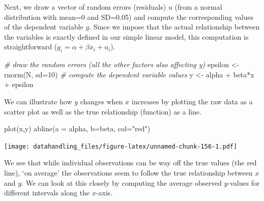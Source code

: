 \documentclass[
  12pt,
]{style/krantz}
\newenvironment{Shaded}{\begin{snugshade}}{\end{snugshade}}
\newcommand{\AttributeTok}[1]{\textcolor[rgb]{0.77,0.63,0.00}{#1}}
\newcommand{\CommentTok}[1]{\textcolor[rgb]{0.56,0.35,0.01}{\textit{#1}}}
\newcommand{\DecValTok}[1]{\textcolor[rgb]{0.00,0.00,0.81}{#1}}
\newcommand{\FunctionTok}[1]{\textcolor[rgb]{0.00,0.00,0.00}{#1}}
\newcommand{\NormalTok}[1]{#1}
\newcommand{\OtherTok}[1]{\textcolor[rgb]{0.56,0.35,0.01}{#1}}
\newcommand{\SpecialCharTok}[1]{\textcolor[rgb]{0.00,0.00,0.00}{#1}}
\newcommand{\StringTok}[1]{\textcolor[rgb]{0.31,0.60,0.02}{#1}}
\begin{document}
Next, we draw a vector of random errors (residuals) \(u\) (from a normal distribution with mean=0 and SD=0.05) and compute the corresponding values of the dependent variable \(y\). Since we impose that the actual relationship between the variables is exactly defined in our simple linear model, this computation is straightforward (\(y_{i}= \alpha + \beta x_{i} + u_{i}\)).

\begin{Shaded}
\begin{Highlighting}[]
\CommentTok{\# draw the random errors (all the other factors also affecting y)}
\NormalTok{epsilon }\OtherTok{\textless{}{-}} \FunctionTok{rnorm}\NormalTok{(N, }\AttributeTok{sd=}\DecValTok{10}\NormalTok{)}
\CommentTok{\# compute the dependent variable values}
\NormalTok{y }\OtherTok{\textless{}{-}}\NormalTok{ alpha }\SpecialCharTok{+}\NormalTok{ beta}\SpecialCharTok{*}\NormalTok{x }\SpecialCharTok{+}\NormalTok{ epsilon}
\end{Highlighting}
\end{Shaded}

We can illustrate how \(y\) changes when \(x\) increases by plotting the raw data as a scatter plot as well as the true relationship (function) as a line.

\begin{Shaded}
\begin{Highlighting}[]
\FunctionTok{plot}\NormalTok{(x,y)}
\FunctionTok{abline}\NormalTok{(}\AttributeTok{a =}\NormalTok{ alpha, }\AttributeTok{b=}\NormalTok{beta, }\AttributeTok{col=}\StringTok{"red"}\NormalTok{)}
\end{Highlighting}
\end{Shaded}

\texttt{[image: datahandling\_files/figure-latex/unnamed-chunk-156-1.pdf]}

We see that while individual observations can be way off the true values (the red line), `on average' the observations seem to follow the true relationship between \(x\) and \(y\). We can look at this closely by computing the average observed \(y\)-values for different intervals along the \(x\)-axis.
\end{document}
